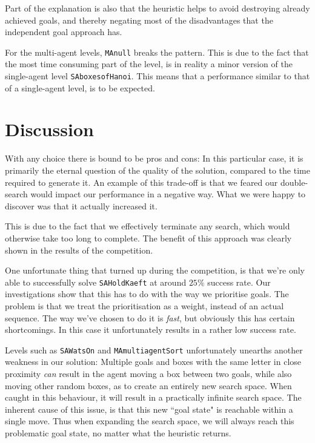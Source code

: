 \documentclass[letterpaper]{article}
\begin{document}
		Part of the explanation is also that the heuristic helps to avoid destroying already achieved goals, and thereby negating most of the disadvantages that the independent goal approach has. 
		
		For the multi-agent levels, \verb|MAnull| breaks the pattern. This is due to the fact that the most time consuming part of the level, is in reality a minor version of the single-agent level \verb=SAboxesofHanoi=. This means that a performance similar to that of a single-agent level, is to be expected. 

	
	
\section{Discussion}
	\label{disscussion}
	With any choice there is bound to be pros and cons: In this particular case, it is primarily the eternal question of the quality of the solution, compared to the time required to generate it. An example of this trade-off is that we feared our double-search would impact our performance in a negative way. What we were happy to discover was that it actually increased it. 

	This is due to the fact that we effectively terminate any search, which would otherwise take too long to complete. The benefit of this approach was clearly shown in the results of the competition.

	One unfortunate thing that turned up during the competition, is that we're only able to successfully solve \verb=SAHoldKaeft= at around $25\%$ success rate. Our investigations show that this has to do with the way we prioritise goals. The problem is that we treat the prioritisation as a weight, instead of an actual sequence. The way we've chosen to do it is \emph{fast}, but obviously this has certain shortcomings. In this case it unfortunately results in a rather low success rate. 

	Levels such as \verb=SAWatsOn= and \verb=MAmultiagentSort= unfortunately unearths another weakness in our solution: Multiple goals and boxes with the same letter in close proximity \emph{can} result in the agent moving a box between two goals, while also moving other random boxes, as to create an entirely new search space. When caught in this behaviour, it will result in a practically infinite search space. The inherent cause of this issue, is that this new ``goal state" is reachable within a single move. Thus when expanding the search space, we will always reach this problematic goal state, no matter what the heuristic returns.
\end{document}
